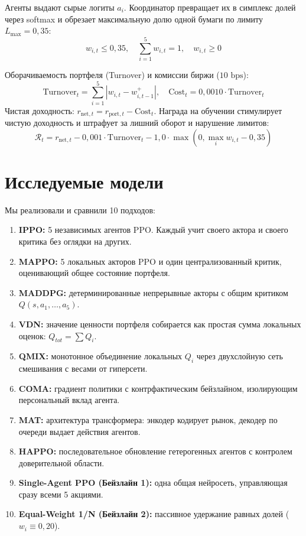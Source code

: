 \documentclass[11pt,a4paper]{article}
\begin{document}
Агенты выдают сырые логиты $a_i$. Координатор превращает их в симплекс долей через softmax и обрезает максимальную долю одной бумаги по лимиту $L_{\max} = 0{,}35$:
$$w_{i, t} \le 0{,}35, \quad \sum_{i=1}^5 w_{i, t} = 1, \quad w_{i, t} \ge 0$$

Оборачиваемость портфеля (Turnover) и комиссии биржи ($10\text{ bps}$):
$$\text{Turnover}_t = \sum_{i=1}^5 |w_{i, t} - w_{i, t-1}^+|, \quad \text{Cost}_t = 0{,}0010 \cdot \text{Turnover}_t$$
Чистая доходность: $r_{\text{net}, t} = r_{\text{port}, t} - \text{Cost}_t$.
Награда на обучении стимулирует чистую доходность и штрафует за лишний оборот и нарушение лимитов:
$$\mathcal{R}_t = r_{\text{net}, t} - 0{,}001 \cdot \text{Turnover}_t - 1{,}0 \cdot \max(0, \max_i w_{i, t} - 0{,}35)$$

\section{Исследуемые модели}

Мы реализовали и сравнили 10 подходов:
\begin{enumerate}[leftmargin=*]
\item \textbf{IPPO:} 5 независимых агентов PPO. Каждый учит своего актора и своего критика без оглядки на других.
\item \textbf{MAPPO:} 5 локальных акторов PPO и один централизованный критик, оценивающий общее состояние портфеля.
\item \textbf{MADDPG:} детерминированные непрерывные акторы с общим критиком $Q(s, a_1, \dots, a_5)$.
\item \textbf{VDN:} значение ценности портфеля собирается как простая сумма локальных оценок: $Q_{tot} = \sum Q_i$.
\item \textbf{QMIX:} монотонное объединение локальных $Q_i$ через двухслойную сеть смешивания с весами от гиперсети.
\item \textbf{COMA:} градиент политики с контрфактическим бейзлайном, изолирующим персональный вклад агента.
\item \textbf{MAT:} архитектура трансформера: энкодер кодирует рынок, декодер по очереди выдает действия агентов.
\item \textbf{HAPPO:} последовательное обновление гетерогенных агентов с контролем доверительной области.
\item \textbf{Single-Agent PPO (Бейзлайн 1):} одна общая нейросеть, управляющая сразу всеми 5 акциями.
\item \textbf{Equal-Weight 1/N (Бейзлайн 2):} пассивное удержание равных долей ($w_i \equiv 0{,}20$).
\end{enumerate}
\end{document}

